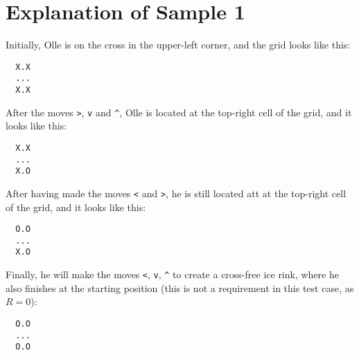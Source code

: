 \section*{Explanation of Sample 1}
Initially, Olle is on the cross in the upper-left corner, and the grid looks like this:
\noindent
\begin{verbatim}
  X.X
  ...
  X.X
\end{verbatim}
After the moves \verb|>|, \verb|v| and \verb|^|, Olle is located at the top-right cell of the grid, and it looks like this:
\noindent
\begin{verbatim}
  X.X
  ...
  X.O
\end{verbatim}
After having made the moves \verb|<| and \verb|>|, he is still located att at the top-right cell of the grid, and it looks like this:
\noindent
\begin{verbatim}
  O.O
  ...
  X.O
\end{verbatim}
Finally, he will make the moves \verb|<|, \verb|v|, \verb|^| to create a cross-free ice rink, where he also
finishes at the starting position (this is not a requirement in this test case, as $R=0$):
\noindent
\begin{verbatim}
  O.O
  ...
  O.O
\end{verbatim}

